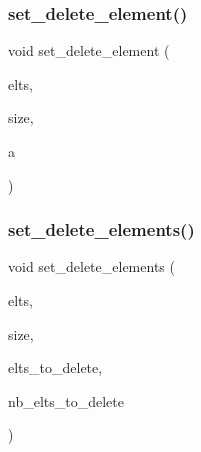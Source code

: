 \subsubsection{\texorpdfstring{set\+\_\+delete\+\_\+element()}{set\_delete\_element()}}
{\footnotesize\ttfamily void set\+\_\+delete\+\_\+element (\begin{DoxyParamCaption}\item[{\mbox{\hyperlink{galois_8h_a09fddde158a3a20bd2dcadb609de11dc}{I\+NT}} $\ast$}]{elts,  }\item[{\mbox{\hyperlink{galois_8h_a09fddde158a3a20bd2dcadb609de11dc}{I\+NT}} \&}]{size,  }\item[{\mbox{\hyperlink{galois_8h_a09fddde158a3a20bd2dcadb609de11dc}{I\+NT}}}]{a }\end{DoxyParamCaption})}

\mbox{\label{combinatorics_8_c_a21fa86aeaa00a73ca630d53e6c37bcd1}} 
\subsubsection{\texorpdfstring{set\+\_\+delete\+\_\+elements()}{set\_delete\_elements()}}
{\footnotesize\ttfamily void set\+\_\+delete\+\_\+elements (\begin{DoxyParamCaption}\item[{\mbox{\hyperlink{galois_8h_a09fddde158a3a20bd2dcadb609de11dc}{I\+NT}} $\ast$}]{elts,  }\item[{\mbox{\hyperlink{galois_8h_a09fddde158a3a20bd2dcadb609de11dc}{I\+NT}} \&}]{size,  }\item[{\mbox{\hyperlink{galois_8h_a09fddde158a3a20bd2dcadb609de11dc}{I\+NT}} $\ast$}]{elts\+\_\+to\+\_\+delete,  }\item[{\mbox{\hyperlink{galois_8h_a09fddde158a3a20bd2dcadb609de11dc}{I\+NT}}}]{nb\+\_\+elts\+\_\+to\+\_\+delete }\end{DoxyParamCaption})}

\mbox{\label{combinatorics_8_c_a42d9da9490635e5093abf4549896e530}} 
